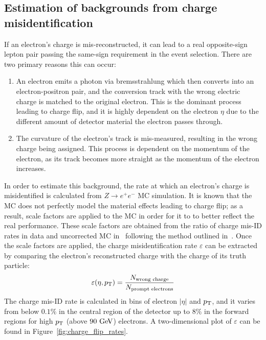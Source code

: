 \subsection{Estimation of backgrounds from charge misidentification}\label{ssww13tev:charge_misid}
If an electron's charge is mis-reconstructed, it can lead to a real opposite-sign lepton pair passing the same-sign requirement in the event selection.
There are two primary reasons this can occur:
\begin{enumerate}
\item An electron emits a photon via bremsstrahlung which then converts into an electron-positron pair, and the conversion track with the wrong electric charge is matched to the original electron.
This is the dominant process leading to charge flip, and it is highly dependent on the electron $\eta$ due to the different amount of detector material the electron passes through.
\item The curvature of the electron's track is mis-measured, resulting in the wrong charge being assigned.
This process is dependent on the momentum of the electron, as its track becomes more straight as the momentum of the electron increases.
\end{enumerate}

In order to estimate this background, the rate at which an electron's charge is misidentified is calculated from $Z\rightarrow e^{+}e^{-}$ MC simulation.
It is known that the MC does not perfectly model the material effects leading to charge flip; as a result, scale factors are applied to the MC in order for it to to better reflect the real performance.
These scale factors are obtained from the ratio of charge mis-ID rates in data and uncorrected MC in~\cite{2018.ssww-13tev-atlas-support} following the method outlined in~\cite{2017.charge-flip-support}.
Once the scale factors are applied, the charge misidentification rate $\varepsilon$ can be extracted by comparing the electron's reconstructed charge with the charge of its truth particle:
\begin{equation}
  \varepsilon(\eta,\pt) = \frac{N_{\textrm{wrong\ charge}}}{N_{\textrm{prompt\ electrons}}}
\end{equation}
The charge mis-ID rate is calculated in bins of electron $|\eta|$ and $p_{\mathrm{T}}$, and it varies from below $0.1\%$ in the central region of the detector up to $8\%$ in the forward regions for high $p_{\mathrm{T}}$ (above $90\gev$) electrons.
A two-dimensional plot of $\varepsilon$ can be found in Figure~\ref{fig:charge_flip_rates}.

